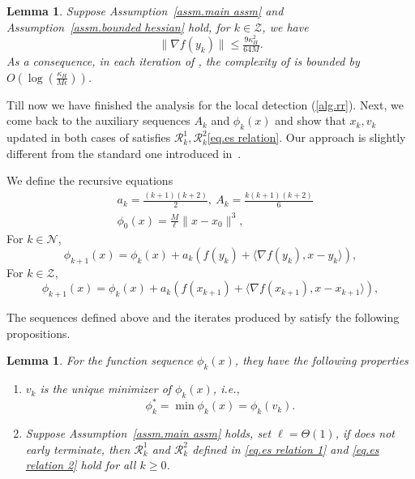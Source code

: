 \documentclass{article}
\theoremstyle{plain}
\newtheorem{lemma}[theorem]{Lemma}
\theoremstyle{definition}
\theoremstyle{remark}
\begin{document}
\begin{lemma}
    \label{lem.upper bound for zero lambda}
    Suppose Assumption~\ref{assm.main assm} and Assumption~\ref{assm.bounded hessian} hold, for $k\in \mathcal{Z}$, we have
    \begin{equation}
        \label{eq.upper bound for zero lambda}
        \|\nabla f(y_k)\|\leq \tfrac{9\kappa_H^2}{64M}.
    \end{equation}
    As a consequence, in each iteration of , the complexity of  is bounded by $O\left(\log\left(\tfrac{\kappa_H}{M\epsilon}\right)\right)$.
\end{lemma}
Till now we have finished the analysis for the local detection (\cref{alg.rr}). Next, we come back to the auxiliary sequences $A_k$ and $\phi_k(x)$ and show that $x_k,v_k$ updated in both cases of  satisfies $\mathcal{R}_k^1,\mathcal{R}_k^2$\eqref{eq.es relation}. Our approach is slightly different from the standard one introduced in~\citet{nesterov_lectures_2018}.

We define the recursive equations
\begin{align}
    \label{eq.update a and A}
     & a_k = \tfrac{(k+1)(k+2)}{2}, \ A_k=\tfrac{k(k+1)(k+2)}{6} \\
    \label{eq.update phi}
     & \phi_0(x) = \tfrac{M}{\ell}\|x-x_0\|^3,
\end{align}
For $k\in\mathcal{N}$,
\begin{equation}\label{eq.update phi 1}
    \phi_{k+1}(x) =\phi_k(x)+a_k\left (f(y_k)+\langle \nabla f(y_k),x-y_k\rangle \right),
\end{equation}
For $k\in\mathcal{Z}$,
\begin{equation}\label{eq.update phi 2}
    \phi_{k+1}(x) =\phi_k(x)+a_k\left (f(x_{k+1})+\langle \nabla f(x_{k+1}),x-x_{k+1}\rangle \right ),
\end{equation}

The sequences defined above and the iterates produced by  satisfy the following propositions.
\begin{lemma}
    \label{lem.property of phi}
    For the function sequence $\phi_k(x)$, they have the following properties
    \begin{enumerate}
        \item $v_k$ is the unique minimizer of $\phi_k(x)$, i.e.,
              \begin{equation*}
                  \phi_k^* =\min \phi_k(x) = \phi_k(v_k).
              \end{equation*}
        \item Suppose Assumption~\ref{assm.main assm} holds, set $\ell = \Theta(1)$, if  does not early terminate, then $\mathcal{R}_k^1$ and $\mathcal{R}_k^2$ defined in \eqref{eq.es relation 1} and \eqref{eq.es relation 2} hold for all $k\geq0$.
    \end{enumerate}
\end{lemma}
\end{document}
